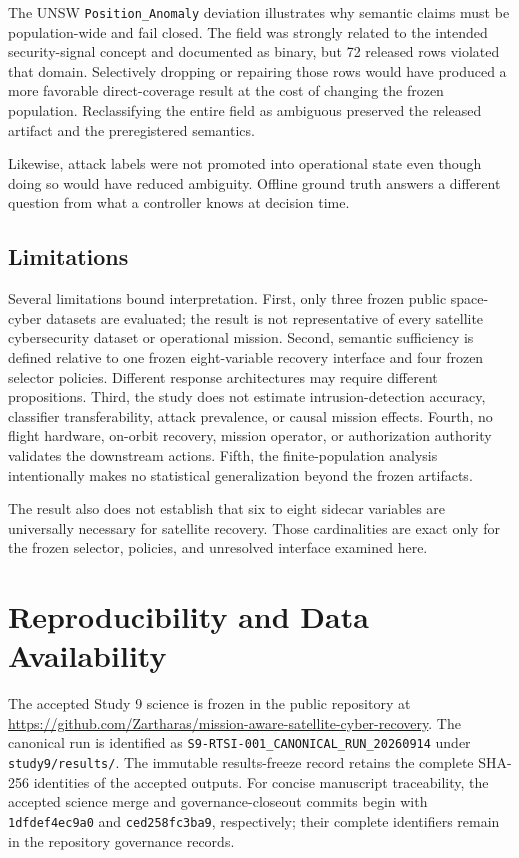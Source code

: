 \documentclass[preprint,12pt]{elsarticle}
\begin{document}
The UNSW \texttt{Position\_Anomaly} deviation illustrates why semantic claims must be population-wide and fail closed. The field was strongly related to the intended security-signal concept and documented as binary, but 72 released rows violated that domain. Selectively dropping or repairing those rows would have produced a more favorable direct-coverage result at the cost of changing the frozen population. Reclassifying the entire field as ambiguous preserved the released artifact and the preregistered semantics.

Likewise, attack labels were not promoted into operational state even though doing so would have reduced ambiguity. Offline ground truth answers a different question from what a controller knows at decision time.

\subsection{Limitations}

Several limitations bound interpretation. First, only three frozen public space-cyber datasets are evaluated; the result is not representative of every satellite cybersecurity dataset or operational mission. Second, semantic sufficiency is defined relative to one frozen eight-variable recovery interface and four frozen selector policies. Different response architectures may require different propositions. Third, the study does not estimate intrusion-detection accuracy, classifier transferability, attack prevalence, or causal mission effects. Fourth, no flight hardware, on-orbit recovery, mission operator, or authorization authority validates the downstream actions. Fifth, the finite-population analysis intentionally makes no statistical generalization beyond the frozen artifacts.

The result also does not establish that six to eight sidecar variables are universally necessary for satellite recovery. Those cardinalities are exact only for the frozen selector, policies, and unresolved interface examined here.

\section{Reproducibility and Data Availability}

The accepted Study 9 science is frozen in the public repository at
\url{https://github.com/Zartharas/mission-aware-satellite-cyber-recovery}.
The canonical run is identified as
\texttt{S9-RTSI-001\_CANONICAL\_RUN\_20260914} under \texttt{study9/results/}.
The immutable results-freeze record retains the complete SHA-256 identities of the accepted outputs. For concise manuscript traceability, the accepted science merge and governance-closeout commits begin with \texttt{1dfdef4ec9a0} and \texttt{ced258fc3ba9}, respectively; their complete identifiers remain in the repository governance records.
\end{document}
